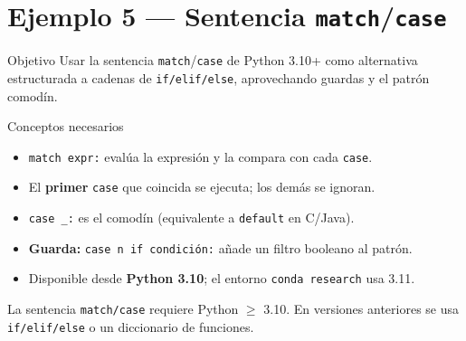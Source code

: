 \documentclass[12pt,a4paper]{article}
\begin{document}
\newpage
\section{Ejemplo 5 — Sentencia \texttt{match}/\texttt{case}}
\label{sec:ejemplo5}

\begin{objetivobox}{Objetivo}
Usar la sentencia \texttt{match}/\texttt{case} de Python 3.10+ como alternativa
estructurada a cadenas de \texttt{if/elif/else}, aprovechando guardas y el
patrón comodín.
\end{objetivobox}

\vspace{0.6em}
\begin{conceptobox}{Conceptos necesarios}
\begin{itemize}
  \item \texttt{match expr:} evalúa la expresión y la compara con cada \texttt{case}.
  \item El \textbf{primer} \texttt{case} que coincida se ejecuta; los demás se ignoran.
  \item \texttt{case \_:} es el comodín (equivalente a \texttt{default} en C/Java).
  \item \textbf{Guarda:} \texttt{case n if condición:} añade un filtro booleano al patrón.
  \item Disponible desde \textbf{Python 3.10}; el entorno \texttt{conda research} usa 3.11.
\end{itemize}
\end{conceptobox}

\begin{tcolorbox}[colback=yellow!8,colframe=orange!60,
                  fonttitle=\bfseries\small,title={Nota de compatibilidad}]
\small
La sentencia \texttt{match/case} requiere Python $\geq$ 3.10. En versiones anteriores
se usa \texttt{if/elif/else} o un diccionario de funciones.
\end{tcolorbox}
\end{document}
